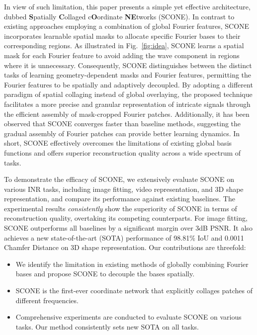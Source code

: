 \documentclass[letterpaper]{article} %
\begin{document}
In view of such limitation, this paper presents a simple yet effective architecture, dubbed \textbf{S}patially \textbf{C}ollaged c\textbf{O}ordinate \textbf{NE}tworks (SCONE). In contrast to existing approaches employing a combination of global Fourier features, SCONE incorporates learnable spatial masks to allocate specific Fourier bases to their corresponding regions. As illustrated in Fig.~\ref{fig:idea}, SCONE learns a spatial mask for each Fourier feature to avoid adding the wave component in regions where it is unnecessary. Consequently, SCONE distinguishes between the distinct tasks of learning geometry-dependent masks and Fourier features, permitting the Fourier features to be spatially and adaptively decoupled. By adopting a different paradigm of spatial collaging instead of global overlaying, the proposed technique facilitates a more precise and granular representation of intricate signals through the efficient assembly of mask-cropped Fourier patches. Additionally, it has been observed that SCONE converges faster than baseline methods, suggesting the gradual assembly of Fourier patches can provide better learning dynamics. In short, SCONE effectively overcomes the limitations of existing global basis functions and offers superior reconstruction quality across a wide spectrum of tasks.


To demonstrate the efficacy of SCONE, we extensively evaluate SCONE on various INR tasks, including image fitting, video representation, and 3D shape representation, and compare its performance against existing baselines. The experimental results \textit{consistently} show the superiority of SCONE in terms of reconstruction quality, overtaking its competing counterparts. For image fitting, SCONE outperforms all  baselines by a significant margin over 3dB PSNR. It also achieves a new state-of-the-art (SOTA) performance of 98.81\% IoU and 0.0011 Chamfer Distance on 3D shape representation. Our contributions are threefold:
\begin{itemize}
    \item We identify the limitation in existing methods of globally combining Fourier bases and propose SCONE to decouple the bases spatially.
    \item SCONE is the first-ever coordinate network that explicitly collages patches of different frequencies.
    \item Comprehensive experiments are conducted to evaluate SCONE on various tasks. Our method consistently sets new SOTA on all tasks.
\end{itemize}
\end{document}
